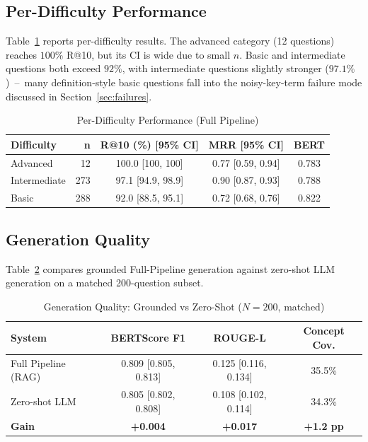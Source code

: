 \documentclass[conference]{IEEEtran}
\begin{document}
\subsection{Per-Difficulty Performance}
Table~\ref{tab:per_diff} reports per-difficulty results. The advanced category (12 questions) reaches $100\%$ R@10, but its CI is wide due to small $n$. Basic and intermediate questions both exceed $92\%$, with intermediate questions slightly stronger ($97.1\%$)~--~many definition-style basic questions fall into the noisy-key-term failure mode discussed in Section~\ref{sec:failures}.

\begin{table}[!t]
\caption{Per-Difficulty Performance (Full Pipeline)}
\label{tab:per_diff}
\centering\scriptsize
\setlength{\tabcolsep}{3pt}
\begin{tabular}{@{}l r c c c@{}}
\toprule
\textbf{Difficulty} & \textbf{n} & \textbf{R@10 (\%) [95\% CI]} & \textbf{MRR [95\% CI]} & \textbf{BERT} \\
\midrule
Advanced      &  12 & 100.0 [100, 100]  & 0.77 [0.59, 0.94] & 0.783 \\
Intermediate  & 273 & 97.1 [94.9, 98.9] & 0.90 [0.87, 0.93] & 0.788 \\
Basic         & 288 & 92.0 [88.5, 95.1] & 0.72 [0.68, 0.76] & 0.822 \\
\bottomrule
\end{tabular}
\end{table}

\subsection{Generation Quality}
Table~\ref{tab:gen_quality} compares grounded Full-Pipeline generation against zero-shot LLM generation on a matched 200-question subset.

\begin{table}[!t]
\caption{Generation Quality: Grounded vs Zero-Shot ($N = 200$, matched)}
\label{tab:gen_quality}
\centering\scriptsize
\setlength{\tabcolsep}{3pt}
\begin{tabular}{@{}l c c c@{}}
\toprule
\textbf{System} & \textbf{BERTScore F1} & \textbf{ROUGE-L} & \textbf{Concept Cov.} \\
\midrule
Full Pipeline (RAG) & 0.809 [0.805, 0.813] & 0.125 [0.116, 0.134] & 35.5\% \\
Zero-shot LLM       & 0.805 [0.802, 0.808] & 0.108 [0.102, 0.114] & 34.3\% \\
\midrule
\textbf{Gain} & \textbf{+0.004} & \textbf{+0.017} & \textbf{+1.2 pp} \\
\bottomrule
\end{tabular}
\end{table}
\end{document}

